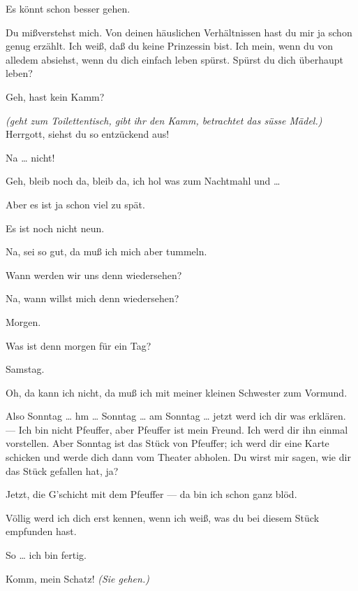 \documentclass[
	final,
	a4paper,
	ngerman,
	mpinclude = true, %
	twoside = true,
	open = right,
	cleardoublepage = plain,
	DIV = 13,
	BCOR = 1cm,
	titlepage = firstiscover,
	]{scrbook}
\newcommand{\direction}[1]{\textit{(#1)}}
\newcommand{\thecharacter}[1]{\textup{\textsc{#1}}\xspace}
\newcommand{\thesuesse}{\thecharacter{Süßes Mädel}}
\newcommand{\thedichter}{\thecharacter{Dichter}}
\newcommand{\character}[1]{\item[#1:]}
\newcommand{\suesse}{\character{\thesuesse}}
\newcommand{\dichter}{\character{\thedichter}}
\begin{document}
\begin{play}
	\suesse
	Es könnt schon besser gehen.

	\dichter
	Du mißverstehst mich. Von deinen häuslichen Verhältnissen hast du mir ja schon genug erzählt. Ich weiß, daß du keine Prinzessin bist. Ich mein, wenn du von alledem absiehst, wenn du dich einfach leben spürst. Spürst du dich überhaupt leben?

	\suesse
	Geh, hast kein Kamm?

	\dichter
	\direction{geht zum Toilettentisch, gibt ihr den Kamm, betrachtet das süsse Mädel.} Herrgott, siehst du so entzückend aus!

	\suesse
	Na \ldots{} nicht!

	\dichter
	Geh, bleib noch da, bleib da, ich hol was zum Nachtmahl und \ldots{}

	\suesse
	Aber es ist ja schon viel zu spät.

	\dichter
	Es ist noch nicht neun.

	\suesse
	Na, sei so gut, da muß ich mich aber tummeln.

	\dichter
	Wann werden wir uns denn wiedersehen?

	\suesse
	Na, wann willst mich denn wiedersehen?

	\dichter
	Morgen.

	\suesse
	Was ist denn morgen für ein Tag?

	\dichter
	Samstag.

	\suesse
	Oh, da kann ich nicht, da muß ich mit meiner kleinen Schwester zum Vormund.

	\dichter
	Also Sonntag \ldots{} hm \ldots{} Sonntag \ldots{} am Sonntag \ldots{} jetzt werd ich dir was erklären. --- Ich bin nicht Pfeuffer, aber Pfeuffer ist mein Freund. Ich werd dir ihn einmal vorstellen. Aber Sonntag ist das Stück von Pfeuffer; ich werd dir eine Karte schicken und werde dich dann vom Theater abholen. Du wirst mir sagen, wie dir das Stück gefallen hat, ja?

	\suesse
	Jetzt, die G'schicht mit dem Pfeuffer --- da bin ich schon ganz blöd.

	\dichter
	Völlig werd ich dich erst kennen, wenn ich weiß, was du bei diesem Stück empfunden hast.

	\suesse
	So \ldots{} ich bin fertig.

	\dichter
	Komm, mein Schatz! \direction{Sie gehen.}

\end{play}
\end{document}
